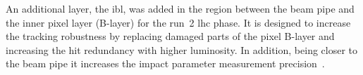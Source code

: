 An additional layer, the \gls{ibl}, was added in the region between the beam
pipe and the inner pixel layer (B-layer) for the run~2 \gls{lhc} phase. It is
designed to increase the tracking robustness by replacing damaged parts of the
pixel B-layer and increasing the hit redundancy with higher luminosity. In
addition, being closer to the beam pipe it increases the impact parameter
measurement precision~\cite{IBL}.
